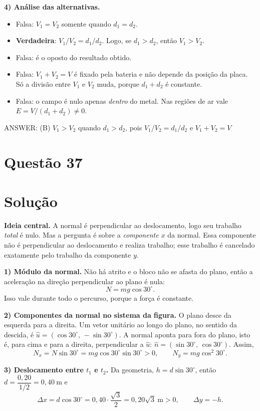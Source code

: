 \documentclass{article}%
\begin{document}
\textbf{4) Análise das alternativas.}
\begin{itemize}
\item[(A)] Falsa: $V_1=V_2$ somente quando $d_1=d_2$.
\item[(B)] \textbf{Verdadeira}: $V_1/V_2=d_1/d_2$. Logo, se $d_1>d_2$, então $V_1>V_2$.
\item[(C)] Falsa: é o oposto do resultado obtido.
\item[(D)] Falsa: $V_1+V_2=V$ é fixado pela bateria e não depende da posição da placa. Só a divisão entre $V_1$ e $V_2$ muda, porque $d_1+d_2$ é constante.
\item[(E)] Falsa: o campo é nulo apenas \emph{dentro} do metal. Nas regiões de ar vale $E=V/(d_1+d_2)\neq 0$.
\end{itemize}

ANSWER: (B) $V_1>V_2$ quando $d_1>d_2$, pois $V_1/V_2=d_1/d_2$ e $V_1+V_2=V$%
\newpage%
\section*{Questão 37}

\section*{Solução}

\textbf{Ideia central.} A normal é perpendicular ao deslocamento, logo seu trabalho \emph{total} é nulo. Mas a pergunta é sobre a \emph{componente $x$} da normal. Essa componente não é perpendicular ao deslocamento e realiza trabalho; esse trabalho é cancelado exatamente pelo trabalho da componente $y$.

\textbf{1) Módulo da normal.} Não há atrito e o bloco não se afasta do plano, então a aceleração na direção perpendicular ao plano é nula:
\[
N = mg\cos 30^\circ .
\]
Isso vale durante todo o percurso, porque a força é constante.

\textbf{2) Componentes da normal no sistema da figura.} O plano desce da esquerda para a direita. Um vetor unitário ao longo do plano, no sentido da descida, é $\hat u=(\cos 30^\circ,\,-\sin 30^\circ)$. A normal aponta para fora do plano, isto é, para cima e para a direita, perpendicular a $\hat u$: $\hat n=(\sin 30^\circ,\,\cos 30^\circ)$. Assim,
\[
N_x = N\sin 30^\circ = mg\cos 30^\circ\sin 30^\circ>0,\qquad N_y = mg\cos^2 30^\circ .
\]

\textbf{3) Deslocamento entre $t_1$ e $t_2$.} Da geometria, $h = d\sin 30^\circ$, então $d=\dfrac{0{,}20}{1/2}=0{,}40\ \text{m}$ e
\[
\Delta x = d\cos 30^\circ = 0{,}40\cdot\frac{\sqrt3}{2}=0{,}20\sqrt3\ \text{m}>0,\qquad \Delta y=-h .
\]
\end{document}
